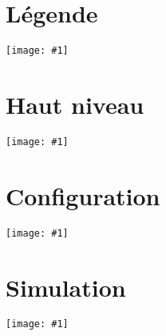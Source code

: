 \newcommand{\image}[1]{%
\begin{center}
\texttt{[image: \#1]}
\end{center}}

\section{Légende}
\image{img/Legende.pdf}
\section{Haut niveau}
\image{img/DEF-full.pdf}
\section{Configuration}
\image{img/Configuration-full.pdf}
\section{Simulation}
\image{img/Simulation-full.pdf}
